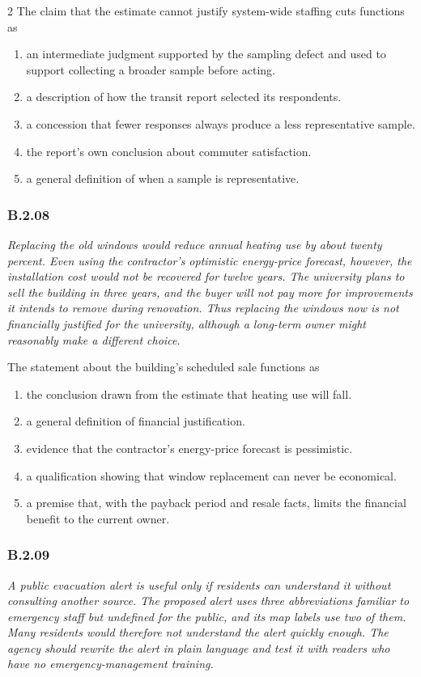\documentclass[10pt]{extarticle}
\newcommand{\choice}[1]{\item #1}
\newcommand{\bankitem}[1]{\subsubsection*{#1}}
\begin{document}
\begin{multicols}{2}
The claim that the estimate cannot justify system-wide staffing cuts functions as
\begin{enumerate}[label=(\alph*)]
  \choice{an intermediate judgment supported by the sampling defect and used to support collecting a broader sample before acting.}
  \choice{a description of how the transit report selected its respondents.}
  \choice{a concession that fewer responses always produce a less representative sample.}
  \choice{the report's own conclusion about commuter satisfaction.}
  \choice{a general definition of when a sample is representative.}
\end{enumerate}
\bankitem{B.2.08}
\emph{Replacing the old windows would reduce annual heating use by about twenty percent. Even using the contractor's optimistic energy-price forecast, however, the installation cost would not be recovered for twelve years. The university plans to sell the building in three years, and the buyer will not pay more for improvements it intends to remove during renovation. Thus replacing the windows now is not financially justified for the university, although a long-term owner might reasonably make a different choice.}

The statement about the building's scheduled sale functions as
\begin{enumerate}[label=(\alph*)]
  \choice{the conclusion drawn from the estimate that heating use will fall.}
  \choice{a general definition of financial justification.}
  \choice{evidence that the contractor's energy-price forecast is pessimistic.}
  \choice{a qualification showing that window replacement can never be economical.}
  \choice{a premise that, with the payback period and resale facts, limits the financial benefit to the current owner.}
\end{enumerate}
\bankitem{B.2.09}
\emph{A public evacuation alert is useful only if residents can understand it without consulting another source. The proposed alert uses three abbreviations familiar to emergency staff but undefined for the public, and its map labels use two of them. Many residents would therefore not understand the alert quickly enough. The agency should rewrite the alert in plain language and test it with readers who have no emergency-management training.}


\end{multicols}
\end{document}
